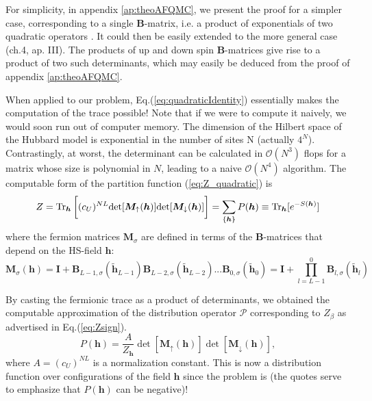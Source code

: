 For simplicity, in appendix \ref{ap:theoAFQMC}, we present the proof for a simpler case, corresponding to a single $\bm B$-matrix, i.e. a product of exponentials of two quadratic operators \cite{hirsch_two-dimensional_1985}.
It could then be easily extended to the more general case \cite{hanke_electronic_nodate}(ch.4, ap. III).
The products of up and down spin $\bm B$-matrices give rise to a product of two such determinants, which may easily be deduced from the proof of appendix \ref{ap:theoAFQMC}.

When applied to our problem, Eq.(\ref{eq:quadraticIdentity}) essentially makes the computation of the trace possible! Note that if we were to compute it naively, we would soon run out of computer memory.
The dimension of the Hilbert space of the Hubbard model is exponential in the number of sites N (actually $4^N$).
Contrastingly, at worst, the determinant can be calculated in $\mathcal{O}(N^3)$ flops for a matrix whose size is polynomial in $N$, leading to a naive $\mathcal{O}(N^4)$ algorithm.
The computable form of the partition function (\ref{eq:Z_quadratic}) is
\begin{equation}\label{eq:effectiveDensityMatrix}
Z =  \operatorname{Tr}_{\bm h} \bigg[ (c_U)^{NL} \text{det} [ \bm M_\uparrow (\bm h)] \text{det} [  \bm M_\downarrow (\bm h) ] \bigg] = \sum_{\{ \bm h \} } P ( \bm h ) \equiv \operatorname{Tr}_{\bm h} [ e^{-S(\bm h) } ]
\end{equation}
where the fermion matrices $\bm M_\sigma$ are defined in terms of the $\bm B$-matrices that depend on the HS-field $\bm h$:
\begin{equation}
\bm M_\sigma (\bm h) = \bm I + \bm B_{L-1,\sigma} ( \widetilde{\bm h}_{L-1}) \bm B_{L-2,\sigma} ( \widetilde{\bm h}_{L-2}) ... \bm B_{0,\sigma} ( \widetilde{\bm h}_0) = \bm I + \prod_{l= L -1}^0 \bm B_{l,\sigma} ( \widetilde{\bm h}_l )
\end{equation}

By casting the fermionic trace as a product of determinants, we obtained the computable approximation of the distribution operator $\mathcal{P}$ corresponding to $Z_{\beta}$ as advertised in Eq.(\ref{eq:Zsign}).
\begin{equation}
P(\bm h) = \frac{A}{Z_{\bm h}} \det [ \bm M_{\uparrow}(\bm h) ] \det [ \bm M_{\downarrow}(\bm h) ] ,
\end{equation}
where $A = (c_U)^{NL}$ is a normalization constant.
This is now a distribution function over configurations of the field $\bm h$ since the problem is  (the quotes serve to emphasize that $P (\bm h )$ can be negative)!

